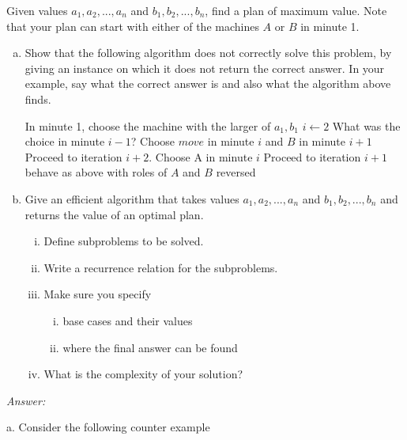 \documentclass[12pt]{article}
\newenvironment{problem}[2][Problem]{\begin{trivlist}
\item[\hskip \labelsep {\bfseries #1}\hskip \labelsep {\bfseries #2.}]}{\end{trivlist}}
\begin{document}
\begin{problem}{5}
   Given values $a_1,a_2,...,a_n$ and $b_1,b_2,...,b_n$, find a plan of maximum value. Note that your plan can start with either of the machines $A$ or $B$ in minute 1.
    \begin{enumerate}[a.]
        \item Show that the following algorithm does not correctly solve this problem, by giving an instance on which it does not return the correct answer. In your example, say what the correct answer is and also what the algorithm above finds.
        \begin{algorithmic}
            \State In minute 1, choose the machine with the larger of $a_1, b_1$
            \State $i \gets 2$
                \State What was the choice in minute $i-1$?
                        \State Choose $move$ in minute $i$ and $B$ in minute $i+1$
                        \State Proceed to iteration $i+2$.
                    \Else 
                        \State Choose A in minute $i$
                        \State Proceed to iteration $i+1$
                    \EndIf
                 behave as above with roles of $A$ and $B$ reversed
                \EndIf
            \EndWhile
        \end{algorithmic}
        \item Give an efficient algorithm that takes values $a_1,a_2,...,a_n$ and $b_1,b_2,...,b_n$ and returns the value of an optimal plan.
        \begin{enumerate}[i.]
            \item Define subproblems to be solved.
            \item Write a recurrence relation for the subproblems.
            \item Make sure you specify
            \begin{enumerate}[i.]
                \item base cases and their values
                \item where the final answer can be found
            \end{enumerate}
            \item What is the complexity of your solution?
        \end{enumerate}
    \end{enumerate}
\end{problem}

\textit{Answer:}

a. Consider the following counter example
\end{document}

